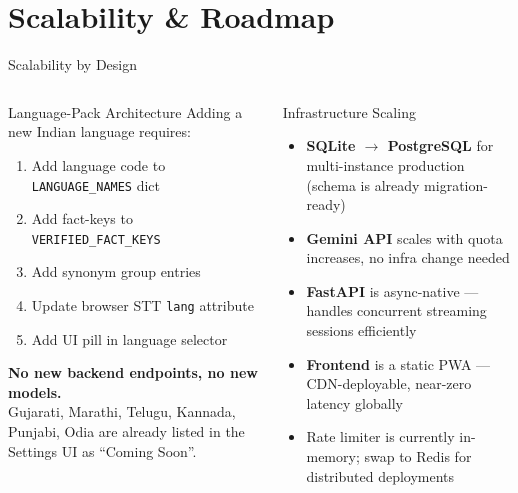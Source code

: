 \documentclass[aspectratio=169, 12pt]{beamer}
\begin{document}
\section{Scalability \& Roadmap}

\begin{frame}{Scalability by Design}
  \begin{columns}[T]
      \begin{block}{Language-Pack Architecture}
        Adding a new Indian language requires:
        \begin{enumerate}\small
          \item Add language code to \texttt{LANGUAGE\_NAMES} dict
          \item Add fact-keys to \texttt{VERIFIED\_FACT\_KEYS}
          \item Add synonym group entries
          \item Update browser STT \texttt{lang} attribute
          \item Add UI pill in language selector
        \end{enumerate}
        \textbf{No new backend endpoints, no new models.}\\
        Gujarati, Marathi, Telugu, Kannada, Punjabi, Odia are
        already listed in the Settings UI as ``Coming Soon''.
      \end{block}
      \begin{block}{Infrastructure Scaling}
        \begin{itemize}\small
          \item \textbf{SQLite $\to$ PostgreSQL} for multi-instance
                production (schema is already migration-ready)
          \item \textbf{Gemini API} scales with quota increases,
                no infra change needed
          \item \textbf{FastAPI} is async-native --- handles concurrent
                streaming sessions efficiently
          \item \textbf{Frontend} is a static PWA --- CDN-deployable,
                near-zero latency globally
          \item Rate limiter is currently in-memory; swap to Redis
                for distributed deployments
        \end{itemize}
      \end{block}
  \end{columns}
\end{frame}
\end{document}
